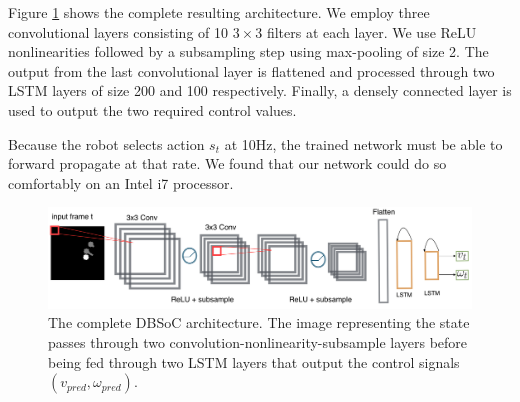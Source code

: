 \documentclass[letterpaper, 10 pt, conference]{ieeeconf}
\begin{document}
Figure \ref{fig:arch} shows the complete resulting architecture. We employ three convolutional layers consisting of 10 $3 \times 3$ filters at each layer. We use ReLU nonlinearities followed by a subsampling step using max-pooling of size 2. The output from the last convolutional layer is flattened and processed through two LSTM layers of size 200 and 100 respectively. Finally, a densely connected layer is used to output the two required control values. 

Because the robot selects action $s_t$ at 10Hz, the trained network must be able to forward propagate at that rate.  We found that our network could do so comfortably on an Intel i7 processor.


  	\begin{figure}[tbh]
	\centering
    \includegraphics[scale = 0.21]{images/arch.png}
  \caption{The complete DBSoC architecture. The image representing the state passes through two convolution-nonlinearity-subsample layers before being fed through two LSTM layers that output the control signals $(v_{pred},\omega_{pred})$. }

  \label{fig:arch}
  \end{figure}

\end{document}
